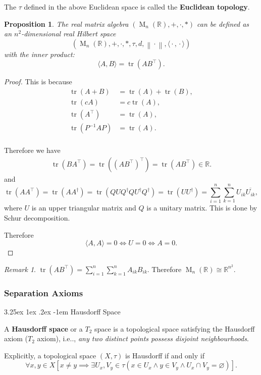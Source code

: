 \documentclass[12pt, letterpaper]{article}
\makeatletter
\newcommand{\transpose}[1]{{{#1}^{\intercal}}}
\newcommand{\re}{\mathbb{R}}
\newcommand{\MM}{\operatorname{M}}
\newcommand\ie{i.e\@ifnextchar.{}{.\@}}
\newcommand{\norm}[1]{\left\lVert #1 \right\rVert}
\newcommand{\hadj}[1]{{#1}^{\dagger}}
\newcommand{\conj}{\overline}
\renewcommand{\emptyset}{\varnothing}
\newcommand*{\wc}{{}\cdot{}}    %
\DeclareMathOperator{\tr}{tr}
\newtheorem{prop}{Proposition}[section]
\renewcommand\paragraph{\@startsection{paragraph}{4}{\z@}%
	{3.25ex \@plus1ex \@minus.2ex}%
	{-1em}%
	{\normalfont\normalsize\bfseries}}
\theoremstyle{definition}
\theoremstyle{remark}
\newtheorem*{rem*}{Remark}
\theoremstyle{definition}
\theoremstyle{plain}
\numberwithin{equation}{section}
\makeatother
\begin{document}
	\begin{def*}
		The $\tau$ defined in the above Euclidean space is called the \textbf{Euclidean topology}.
	\end{def*}

	\begin{prop}
		The real matrix algebra $(\MM_n(\re),+,\cdot,*)$ can be defined as an $n^2$-dimensional real Hilbert space
		\[(\MM_n(\re),+,\cdot,*,\tau,d,\norm{\wc},\langle\wc,\wc\rangle) \]
		with the inner product:
		\[\langle A,B\rangle = \tr(A\transpose{B}). \]
	\end{prop}
	\begin{proof}
		This is because
		\[
		\begin{aligned}
			\tr(A+B)&=\tr(A)+\tr(B),\\
			\tr(cA)&=c\tr(A),\\
			\tr(\transpose{A})&=\tr(A),\\
			\tr(P^{-1}AP)&=\tr(A).\\
		\end{aligned}
		\]
		
		Therefore we have
		\[
		\begin{aligned}
			\tr(B\transpose{A})=\tr(\transpose{(A\transpose{B})})=\tr(A\transpose{B})\in\re.
		\end{aligned}
		\]
		and
		\[
		\tr(A\transpose{A})=\tr(A\hadj{A})=\tr(QU\hadj{Q}Q\hadj{U}\hadj{Q})=\tr(U\hadj{U})=
		\sum_{i=1}^n \sum_{k=1}^n U_{ik}\conj{U_{ik}}	,\]
		where $U$ is an upper triangular matrix and $Q$ is a unitary matrix.
		This is done by Schur decomposition.
		
		Therefore 
		\[\langle A,A\rangle = 0\iff U=0\iff A=0. \]
	\end{proof}
	\begin{rem*}
		$\tr(A\transpose{B}) = \sum_{i=1}^n \sum_{k=1}^n A_{ik}B_{ik}$. Therefore $\MM_n(\re)\cong\re^{n^2}$.
	\end{rem*}

	\subsubsection{Separation Axioms}
	\paragraph{Hausdorff Space}
	\begin{def*}
		A \textbf{Hausdorff space} or a $T_2$ space is a topological space
		satisfying the Hausdorff axiom ($T_2$ axiom), \ie,
		\textit{any two	distinct points possess disjoint neighbourhoods}.
		
		Explicitly, a topological space $(X,\tau)$ is Hausdorff if and only if
		\[\forall x, y\in X[x\ne y\implies \exists U_x, V_y\in\tau
		(x\in U_x\land y\in V_y\land U_x\cap V_y=\emptyset ) ] .\]
	\end{def*}
\end{document}
